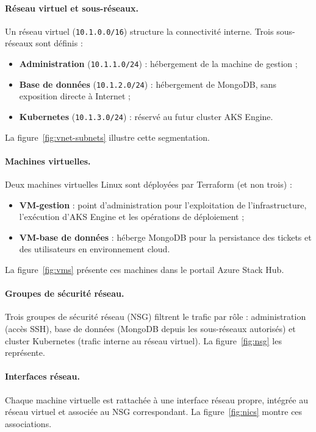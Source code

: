 \paragraph{Réseau virtuel et sous-réseaux.}
Un réseau virtuel (\texttt{10.1.0.0/16}) structure la connectivité interne. Trois sous-réseaux
sont définis :
\begin{itemize}
  \item \textbf{Administration} (\texttt{10.1.1.0/24}) : hébergement de la machine de gestion ;
  \item \textbf{Base de données} (\texttt{10.1.2.0/24}) : hébergement de MongoDB, sans
        exposition directe à Internet ;
  \item \textbf{Kubernetes} (\texttt{10.1.3.0/24}) : réservé au futur cluster AKS Engine.
\end{itemize}
La figure~\ref{fig:vnet-subnets} illustre cette segmentation.

\paragraph{Machines virtuelles.}
Deux machines virtuelles Linux sont déployées par Terraform (et non trois) :
\begin{itemize}
  \item \textbf{VM-gestion} : point d'administration pour l'exploitation de l'infrastructure,
        l'exécution d'AKS Engine et les opérations de déploiement ;
  \item \textbf{VM-base de données} : héberge MongoDB pour la persistance des tickets et des
        utilisateurs en environnement cloud.
\end{itemize}
La figure~\ref{fig:vms} présente ces machines dans le portail Azure Stack Hub.

\paragraph{Groupes de sécurité réseau.}
Trois groupes de sécurité réseau (NSG) filtrent le trafic par rôle : administration (accès
SSH), base de données (MongoDB depuis les sous-réseaux autorisés) et cluster Kubernetes
(trafic interne au réseau virtuel). La figure~\ref{fig:nsg} les représente.

\paragraph{Interfaces réseau.}
Chaque machine virtuelle est rattachée à une interface réseau propre, intégrée au réseau
virtuel et associée au NSG correspondant. La figure~\ref{fig:nics} montre ces associations.

